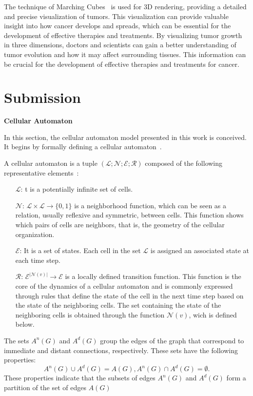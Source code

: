 \documentclass[a4paper,11pt]{article}
\begin{document}
{The technique of Marching Cubes~\cite{5} is used for 3D rendering, providing a detailed and precise visualization of tumors. This visualization can provide valuable insight into how cancer develops and spreads, which can be essential for the development of effective therapies and treatments. By visualizing tumor growth in three dimensions, doctors and scientists can gain a better understanding of tumor evolution and how it may affect surrounding tissues. This information can be crucial for the development of effective therapies and treatments for cancer.


\section*{Submission}

\textbf{Cellular Automaton}

In this section, the cellular automaton model presented in this work is conceived. It begins by formally defining a cellular automaton~\cite{7}.

A cellular automaton is a tuple $(\mathcal{L}; \mathcal{N}; \mathcal{E}; \mathcal{R})$ composed of the following representative elements~\cite{2}:
\begin{itemize}
\item [$\mathcal{L}$:] t is a potentially infinite set of cells.
\item [$\mathcal{N}$:] $\mathcal{L} \times \mathcal{L} \rightarrow \lbrace 0,1 \rbrace$ is a neighborhood function, which can be seen as a relation, usually reflexive and symmetric, between cells. This function shows which pairs of cells are neighbors, that is, the geometry of the cellular organization.
\item [$\mathcal{E}$:] It is a set of states. Each cell in the set $\mathcal{L}$ is assigned an associated state at each time step.
\item [$\mathcal{R}$:] $\mathcal{E}^{|\mathcal{N}(v)|} \rightarrow \mathcal{E}$ is a locally defined transition function. This function is the core of the dynamics of a cellular automaton and is commonly expressed through rules that define the state of the cell in the next time step based on the state of the neighboring cells. The set containing the state of the neighboring cells is obtained through the function $\mathcal{N}(v)$, wich is defined below.
\end{itemize}

The sets $A^n(G)$ and $A^d(G)$ group the edges of the graph that correspond to immediate and distant connections, respectively. These sets have the following properties:
\begin{subequations}
\begin{equation}
A^n(G) \cup A^d(G) = A(G),
\end{equation}
\begin{equation}
A^n(G) \cap A^d(G) = \emptyset.
\end{equation}
\end{subequations}
These properties indicate that the subsets of edges $A^n(G)$ and $A^d(G)$ form a partition of the set of edges $A(G)$

}
\end{document}

